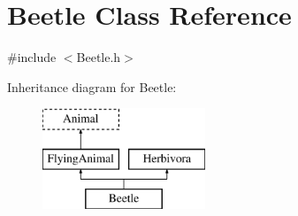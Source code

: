\hypertarget{classBeetle}{\section{Beetle Class Reference}
\label{classBeetle}
}


{\ttfamily \#include $<$Beetle.\-h$>$}

Inheritance diagram for Beetle\-:\begin{figure}[H]
\begin{center}
\leavevmode
\includegraphics[height=3.000000cm]{classBeetle}
\end{center}
\end{figure}
